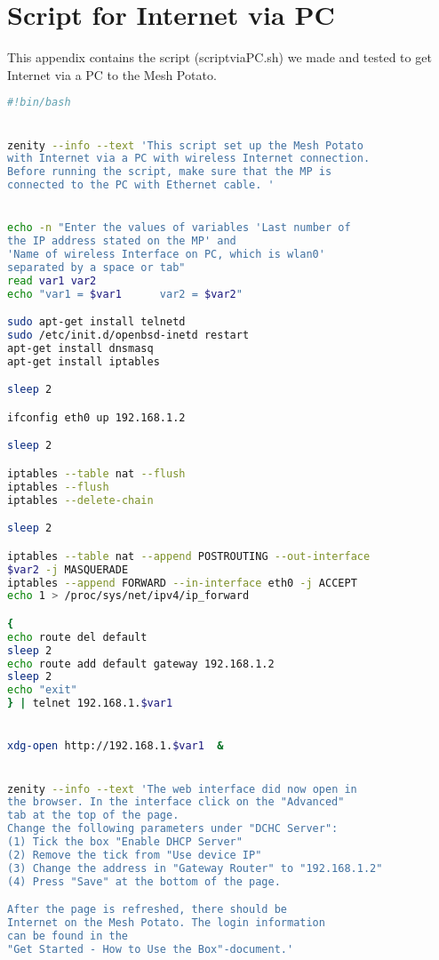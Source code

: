 \chapter{Script for Internet via PC}
\label{chp:appendixD} 

This appendix contains the script (scriptviaPC.sh) we made and tested to get Internet via a PC to the Mesh Potato.  

\begin{framed}
\noindent
\lstset{showstringspaces=false}
\begin{lstlisting}[language=sh]
#!bin/bash


zenity --info --text 'This script set up the Mesh Potato 
with Internet via a PC with wireless Internet connection. 
Before running the script, make sure that the MP is
connected to the PC with Ethernet cable. '


echo -n "Enter the values of variables 'Last number of 
the IP address stated on the MP' and 
'Name of wireless Interface on PC, which is wlan0'
separated by a space or tab"
read var1 var2
echo "var1 = $var1      var2 = $var2"

sudo apt-get install telnetd
sudo /etc/init.d/openbsd-inetd restart
apt-get install dnsmasq
apt-get install iptables 

sleep 2

ifconfig eth0 up 192.168.1.2

sleep 2

iptables --table nat --flush
iptables --flush
iptables --delete-chain

sleep 2

iptables --table nat --append POSTROUTING --out-interface
$var2 -j MASQUERADE
iptables --append FORWARD --in-interface eth0 -j ACCEPT
echo 1 > /proc/sys/net/ipv4/ip_forward

{
echo route del default
sleep 2
echo route add default gateway 192.168.1.2 
sleep 2
echo "exit"
} | telnet 192.168.1.$var1 


xdg-open http://192.168.1.$var1  &


zenity --info --text 'The web interface did now open in 
the browser. In the interface click on the "Advanced" 
tab at the top of the page. 
Change the following parameters under "DCHC Server": 
(1) Tick the box "Enable DHCP Server"
(2) Remove the tick from "Use device IP"
(3) Change the address in "Gateway Router" to "192.168.1.2"
(4) Press "Save" at the bottom of the page. 

After the page is refreshed, there should be 
Internet on the Mesh Potato. The login information 
can be found in the 
"Get Started - How to Use the Box"-document.'

\end{lstlisting}
\end{framed}

